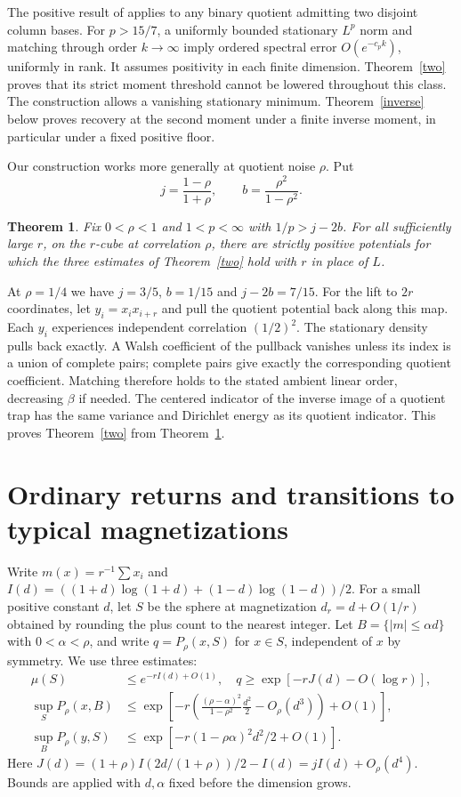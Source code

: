 \documentclass[11pt]{article}
\newtheorem{theorem}{Theorem}
\begin{document}
The positive result of \cite[section 7]{companion} applies to any binary quotient admitting two disjoint column bases. For $p>15/7$, a uniformly bounded stationary $L^p$ norm and matching through order $k\to\infty$ imply ordered spectral error $O(e^{-c_p k})$, uniformly in rank. It assumes positivity in each finite dimension. Theorem~\ref{two} proves that its strict moment threshold cannot be lowered throughout this class. The construction allows a vanishing stationary minimum. Theorem~\ref{inverse} below proves recovery at the second moment under a finite inverse moment, in particular under a fixed positive floor.

Our construction works more generally at quotient noise $\rho$. Put
\[
 j=\frac{1-\rho}{1+\rho},\qquad b=\frac{\rho^2}{1-\rho^2}.
\]
\begin{theorem}\label{general}
Fix $0<\rho<1$ and $1<p<\infty$ with $1/p>j-2b$. For all sufficiently large $r$, on the $r$-cube at correlation $\rho$, there are strictly positive potentials for which the three estimates of Theorem~\ref{two} hold with $r$ in place of $L$.
\end{theorem}
At $\rho=1/4$ we have $j=3/5$, $b=1/15$ and $j-2b=7/15$. For the lift to $2r$ coordinates, let $y_i=x_i x_{i+r}$ and pull the quotient potential back along this map. Each $y_i$ experiences independent correlation $(1/2)^2$. The stationary density pulls back exactly. A Walsh coefficient of the pullback vanishes unless its index is a union of complete pairs; complete pairs give exactly the corresponding quotient coefficient. Matching therefore holds to the stated ambient linear order, decreasing $\beta$ if needed. The centered indicator of the inverse image of a quotient trap has the same variance and Dirichlet energy as its quotient indicator. This proves Theorem~\ref{two} from Theorem~\ref{general}.

\section{Ordinary returns and transitions to typical magnetizations}
Write $m(x)=r^{-1}\sum x_i$ and $I(d)=((1+d)\log(1+d)+(1-d)\log(1-d))/2$.
For a small positive constant $d$, let $S$ be the sphere at magnetization $d_r=d+O(1/r)$ obtained by rounding the plus count to the nearest integer. Let $B=\{|m|\le\alpha d\}$ with $0<\alpha<\rho$, and write $q=P_\rho(x,S)$ for $x\in S$, independent of $x$ by symmetry. We use three estimates:
\begin{align}
 \mu(S)&\le e^{-rI(d)+O(1)},\quad
 q\ge \exp[-rJ(d)-O(\log r)], \label{eq:return}\\
 \sup_{S} P_\rho(x,B)&\le
 \exp\left[-r\left(\frac{(\rho-\alpha)^2}{1-\rho^2}\frac{d^2}{2}
                  -O_\rho(d^3)\right)+O(1)\right],\label{eq:bulk}\\
 \sup_{B} P_\rho(y,S)&\le \exp[-r(1-\rho\alpha)^2d^2/2+O(1)] .\label{eq:back}
\end{align}
Here $J(d)=(1+\rho)I(2d/(1+\rho))/2-I(d)=j I(d)+O_\rho(d^4)$. Bounds are applied with $d,\alpha$ fixed before the dimension grows.
\end{document}

